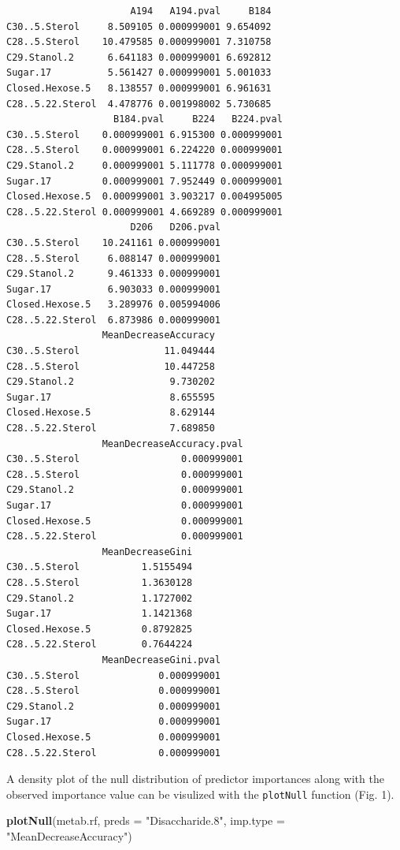 \documentclass[]{article}
\newenvironment{Shaded}{\begin{snugshade}}{\end{snugshade}}
\newcommand{\KeywordTok}[1]{\textcolor[rgb]{0.13,0.29,0.53}{\textbf{{#1}}}}
\newcommand{\DataTypeTok}[1]{\textcolor[rgb]{0.13,0.29,0.53}{{#1}}}
\newcommand{\StringTok}[1]{\textcolor[rgb]{0.31,0.60,0.02}{{#1}}}
\newcommand{\NormalTok}[1]{{#1}}
\begin{document}
\begin{verbatim}
                      A194   A194.pval     B184
C30..5.Sterol     8.509105 0.000999001 9.654092
C28..5.Sterol    10.479585 0.000999001 7.310758
C29.Stanol.2      6.641183 0.000999001 6.692812
Sugar.17          5.561427 0.000999001 5.001033
Closed.Hexose.5   8.138557 0.000999001 6.961631
C28..5.22.Sterol  4.478776 0.001998002 5.730685
                   B184.pval     B224   B224.pval
C30..5.Sterol    0.000999001 6.915300 0.000999001
C28..5.Sterol    0.000999001 6.224220 0.000999001
C29.Stanol.2     0.000999001 5.111778 0.000999001
Sugar.17         0.000999001 7.952449 0.000999001
Closed.Hexose.5  0.000999001 3.903217 0.004995005
C28..5.22.Sterol 0.000999001 4.669289 0.000999001
                      D206   D206.pval
C30..5.Sterol    10.241161 0.000999001
C28..5.Sterol     6.088147 0.000999001
C29.Stanol.2      9.461333 0.000999001
Sugar.17          6.903033 0.000999001
Closed.Hexose.5   3.289976 0.005994006
C28..5.22.Sterol  6.873986 0.000999001
                 MeanDecreaseAccuracy
C30..5.Sterol               11.049444
C28..5.Sterol               10.447258
C29.Stanol.2                 9.730202
Sugar.17                     8.655595
Closed.Hexose.5              8.629144
C28..5.22.Sterol             7.689850
                 MeanDecreaseAccuracy.pval
C30..5.Sterol                  0.000999001
C28..5.Sterol                  0.000999001
C29.Stanol.2                   0.000999001
Sugar.17                       0.000999001
Closed.Hexose.5                0.000999001
C28..5.22.Sterol               0.000999001
                 MeanDecreaseGini
C30..5.Sterol           1.5155494
C28..5.Sterol           1.3630128
C29.Stanol.2            1.1727002
Sugar.17                1.1421368
Closed.Hexose.5         0.8792825
C28..5.22.Sterol        0.7644224
                 MeanDecreaseGini.pval
C30..5.Sterol              0.000999001
C28..5.Sterol              0.000999001
C29.Stanol.2               0.000999001
Sugar.17                   0.000999001
Closed.Hexose.5            0.000999001
C28..5.22.Sterol           0.000999001
\end{verbatim}

A density plot of the null distribution of predictor importances along
with the observed importance value can be visulized with the
\texttt{plotNull} function (Fig. 1).

\begin{Shaded}
\begin{Highlighting}[]
\KeywordTok{plotNull}\NormalTok{(metab.rf, }\DataTypeTok{preds =} \StringTok{"Disaccharide.8"}\NormalTok{, }\DataTypeTok{imp.type =} \StringTok{"MeanDecreaseAccuracy"}\NormalTok{)}
\end{Highlighting}
\end{Shaded}
\end{document}
